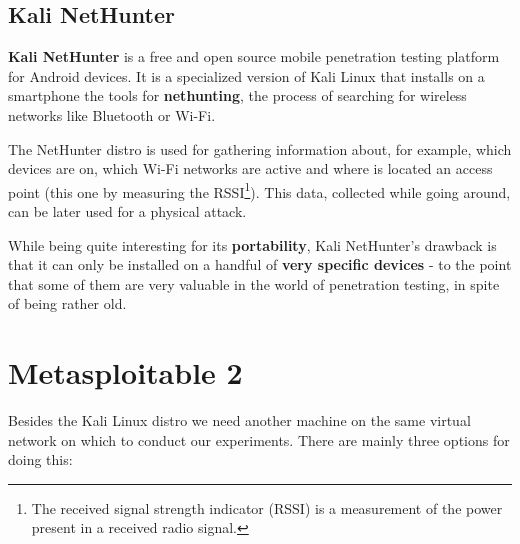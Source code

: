 \vspace{0.5em}


\subsection{Kali NetHunter}
\textbf{Kali NetHunter} is a free and open source mobile penetration testing platform for Android devices. It is a specialized version of Kali Linux that installs on a smartphone the tools for \textbf{nethunting}, the process of searching for wireless networks like Bluetooth or Wi-Fi.

The NetHunter distro is used for gathering information about, for example, which devices are on, which Wi-Fi networks are active and where is located an access point (this one by measuring the RSSI\footnote{The received signal strength indicator (RSSI) is a measurement of the power present in a received radio signal.}). This data, collected while going around, can be later used for a physical attack.

While being quite interesting for its \textbf{portability}, Kali NetHunter’s drawback is that it can only be installed on a handful of \textbf{very specific devices} - to the point that some of them are very valuable in the world of penetration testing, in spite of being rather old.


\section{Metasploitable 2}
Besides the Kali Linux distro we need another machine on the same virtual network on which to conduct our experiments. There are mainly three options for doing this:

